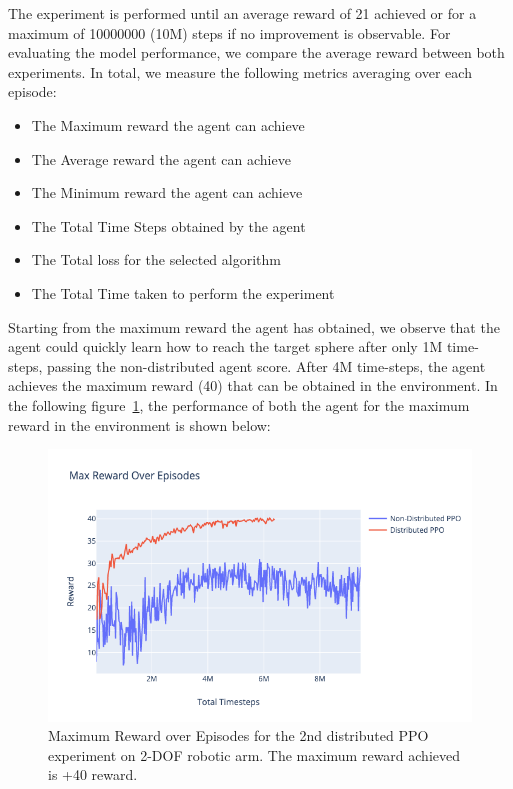 The experiment is performed until an average reward of 21 achieved or for a maximum of 10000000 (10M) steps if no improvement is observable. For evaluating the model performance, we compare the average reward between both experiments. In total, we measure the following metrics averaging over each episode:
\begin{itemize}
		\item The Maximum reward the agent can achieve
		\item The Average reward the agent can achieve
		\item The Minimum reward the agent can achieve
		\item The Total Time Steps obtained by the agent
		\item The Total loss for the selected algorithm
		\item The Total Time taken to perform the experiment
\end{itemize}

Starting from the maximum reward the agent has obtained, we observe that the agent could quickly learn how to reach the target sphere after only 1M time-steps, passing the non-distributed agent score. After 4M time-steps, the agent achieves the maximum reward (40) that can be obtained in the environment. In the following figure~\ref{fig:2nd_exp_max_eps_reward}, the performance of both the agent for the maximum reward in the environment is shown below:
\begin{figure}[H] %
		\centering
		\includegraphics[width=1.2\linewidth]{figures/exps/2nd_exp/max_eps_reward.png}
		\caption{Maximum Reward over Episodes for the 2nd distributed PPO experiment on 2-DOF robotic arm. The maximum reward achieved is +40 reward.}
		\label{fig:2nd_exp_max_eps_reward}
\end{figure}

